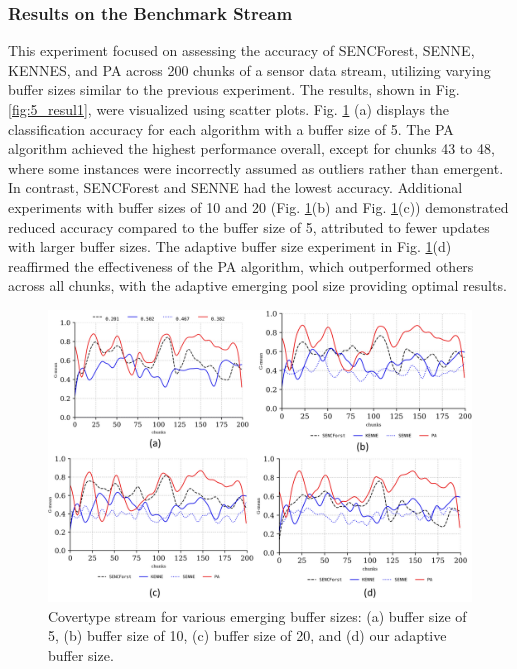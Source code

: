 \subsubsection{Results on the Benchmark Stream}
This experiment focused on assessing the accuracy of SENCForest, SENNE, KENNES, and PA across 200 chunks of a sensor data stream, utilizing varying buffer sizes similar to the previous experiment. The results, shown in Fig. \ref{fig:5_resul1}, were visualized using scatter plots. Fig. \ref{fig:5_result1} (a) displays the classification accuracy for each algorithm with a buffer size of 5. The PA algorithm achieved the highest performance overall, except for chunks 43 to 48, where some instances were incorrectly assumed as outliers rather than emergent. In contrast, SENCForest and SENNE had the lowest accuracy. Additional experiments with buffer sizes of 10 and 20 (Fig. \ref{fig:5_result1}(b) and Fig. \ref{fig:5_result1}(c)) demonstrated reduced accuracy compared to the buffer size of 5, attributed to fewer updates with larger buffer sizes. The adaptive buffer size experiment in Fig. \ref{fig:5_result1}(d) reaffirmed the effectiveness of the PA algorithm, which outperformed others across all chunks, with the adaptive emerging pool size providing optimal results.

\begin{figure}[!ht]
	\centering
	\includegraphics[width=1\linewidth]{5_Emerging/figures/result1}
	\caption{Covertype stream for various emerging buffer sizes: (a) buffer size of 5, (b) buffer size of 10, (c) buffer size of 20, and (d) our adaptive buffer size.}
	\label{fig:5_result1}
\end{figure}

